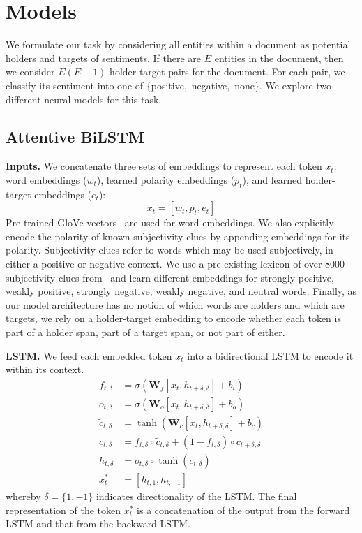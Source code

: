 \documentclass[11pt,a4paper]{article}
\begin{document}
\section{Models}
We formulate our task by considering all entities within a document as potential holders and targets of sentiments. If there are $E$ entities in the document, then we consider $E(E - 1)$ holder-target pairs for the document.
For each pair, we classify its sentiment into one of $\{$positive$,$ negative$,$ none$\}$.
We explore two different neural models for this task.

\subsection{Attentive BiLSTM}

\noindent\textbf{Inputs.}
We concatenate three sets of embeddings to represent each token $x_t$: word embeddings ($w_t$), learned polarity embeddings ($p_t$), and learned holder-target embeddings ($e_t$):
	$$x_t = [w_t, p_t, e_t]$$
Pre-trained GloVe vectors~\cite{Pennington:14} are used for word embeddings.
We also explicitly encode the polarity of known subjectivity clues by appending embeddings for its polarity.
Subjectivity clues refer to words which may be used subjectively, in either a positive or negative context.
We use a pre-existing lexicon of over 8000 subjectivity clues from~ and learn different embeddings for strongly positive, weakly positive, strongly negative, weakly negative, and neutral words.
Finally, as our model architecture has no notion of which words are holders and which are targets, we rely on a holder-target embedding to encode whether each token is part of a holder span, part of a target span, or not part of either.

\noindent\textbf{LSTM.}
We feed each embedded token $x_t$ into a bidirectional LSTM to encode it within its context.
\begin{align*}
f_{t, \delta} & = \sigma(\textbf{W}_f [x_t, h_{t + \delta, \delta}] + b_i) \\
o_{t, \delta} & = \sigma(\textbf{W}_o[x_t, h_{t + \delta,\delta}] + b_o) \\
\tilde{c}_{t, \delta} & = \tanh(\textbf{W}_c[x_t, h_{t + \delta, \delta}] + b_c) \\
c_{t, \delta} & = f_{t, \delta}\circ \tilde{c}_{t, \delta} + (1 - f_{t, \delta})\circ c_{t + \delta, \delta} \\
h_{t, \delta} & = o_{t, \delta}\circ \tanh(c_{t,\delta}) \\
x^*_t & = [h_{t, 1}, h_{t, -1}]
\end{align*}
whereby $\delta = \{1, -1\}$ indicates directionality of the LSTM.
The final representation of the token $x_t^*$ is a concatenation of the output from the forward LSTM and that from the backward LSTM.
\end{document}
